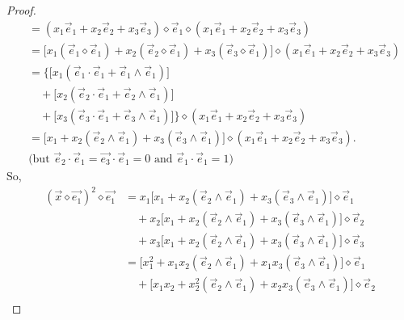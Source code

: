 \documentclass{amsart}
\theoremstyle{plain}
\numberwithin{equation}{section}
\begin{document}
\begin{proof}
\begin{align*}
&= \left(
x_{1}\vec{e}_{1} + x_{2}\vec{e}_{2} + x_{3}\vec{e}_{3}
\right)
\diamond \vec{e}_{1}
\diamond
\left(
x_{1}\vec{e}_{1} + x_{2}\vec{e}_{2} + x_{3}\vec{e}_{3}
\right) \\[6pt]
&= \Big[
x_{1}\left( \vec{e}_{1}\diamond \vec{e}_{1} \right)
+ x_{2}\left( \vec{e}_{2}\diamond \vec{e}_{1} \right)
+ x_{3}\left( \vec{e}_{3}\diamond \vec{e}_{1} \right)
\Big]
\diamond
\left(
x_{1}\vec{e}_{1} + x_{2}\vec{e}_{2} + x_{3}\vec{e}_{3}
\right) \\[6pt]
&= \Bigg\{ \Big[
x_{1}\left( \vec{e}_{1}\cdot \vec{e}_{1} + \vec{e}_{1}\wedge \vec{e}_{1} \right)
\Big] \\
&\quad + \Big[
x_{2}\left( \vec{e}_{2}\cdot \vec{e}_{1} + \vec{e}_{2}\wedge \vec{e}_{1} \right)
\Big] \\
&\quad + \Big[
x_{3}\left( \vec{e}_{3}\cdot \vec{e}_{1} + \vec{e}_{3}\wedge \vec{e}_{1} \right)
\Big]
\Bigg \}
\diamond
\left(
x_{1}\vec{e}_{1} + x_{2}\vec{e}_{2} + x_{3}\vec{e}_{3}
\right) \\[6pt]
&= \Big[
x_{1}
+ x_{2}\left( \vec{e}_{2}\wedge \vec{e}_{1} \right)
+ x_{3}\left( \vec{e}_{3}\wedge \vec{e}_{1} \right)
\Big]
\diamond
\left(
x_{1}\vec{e}_{1} + x_{2}\vec{e}_{2} + x_{3}\vec{e}_{3}
\right). \\[4pt]
&\text{(but $\vec{e}_{2}\cdot \vec{e}_{1}=\vec{e_{3}}\cdot \vec{e}_{1}=0$ and $\vec{e}_{1}\cdot \vec{e}_{1}=1$) }
\end{align*}
So,
\begin{align*}
\left(\vec{x}\diamond\vec{e_1}\right)^2\diamond\vec{e_1}&= x_{1}\Big[
x_{1}+x_{2}\left( \vec{e}_{2}\wedge \vec{e}_{1} \right)
+ x_{3}\left( \vec{e}_{3}\wedge \vec{e}_{1} \right)
\Big]\diamond \vec{e}_{1} \\[4pt]
&\quad + x_{2}\Big[
x_{1}+x_{2}\left( \vec{e}_{2}\wedge \vec{e}_{1} \right)
+ x_{3}\left( \vec{e}_{3}\wedge \vec{e}_{1} \right)
\Big]\diamond \vec{e}_{2} \\[4pt]
&\quad + x_{3}\Big[
x_{1}+x_{2}\left( \vec{e}_{2}\wedge \vec{e}_{1} \right)
+ x_{3}\left( \vec{e}_{3}\wedge \vec{e}_{1} \right)
\Big]\diamond \vec{e}_{3} \\[8pt]
&= \Big[
x_{1}^{2}
+ x_{1}x_{2}\left( \vec{e}_{2}\wedge \vec{e}_{1} \right)
+ x_{1}x_{3}\left( \vec{e}_{3}\wedge \vec{e}_{1} \right)
\Big]\diamond \vec{e}_{1} \\[4pt]
&\quad + \Big[
x_{1}x_{2}
+ x_{2}^{2}\left( \vec{e}_{2}\wedge \vec{e}_{1} \right)
+ x_{2}x_{3}\left( \vec{e}_{3}\wedge \vec{e}_{1} \right)
\Big]\diamond \vec{e}_{2} \\[4pt]

\end{align*}
\end{proof}
\end{document}
